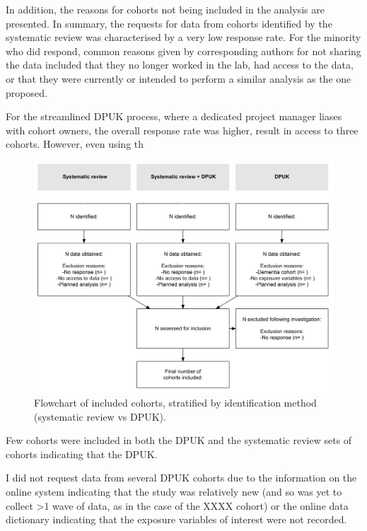 \documentclass[a4paper, twoside]{templates/ociamthesis}
\begin{document}
In addition, the reasons for cohorts not being included in the analysis are presented. In summary, the requests for data from cohorts identified by the systematic review was characterised by a very low response rate. For the minority who did respond, common reasons given by corresponding authors for not sharing the data included that they no longer worked in the lab, had access to the data, or that they were currently or intended to perform a similar analysis as the one proposed.

For the streamlined DPUK process, where a dedicated project manager liases with cohort owners, the overall response rate was higher, result in access to three cohorts. However, even using th





\begin{figure}[H]
\includegraphics[width=1\linewidth]{figures/ipd/cohortFlowchart} \caption[Flowchart]{Flowchart of included cohorts, stratified by identification method (systematic review vs DPUK).}\label{fig:cohortFlowchart}
\end{figure}

Few cohorts were included in both the DPUK and the systematic review sets of cohorts indicating that the DPUK.

I did not request data from several DPUK cohorts due to the information on the online system indicating that the study was relatively new (and so was yet to collect \textgreater1 wave of data, as in the case of the XXXX cohort) or the online data dictionary indicating that the exposure variables of interest were not recorded.
\end{document}
